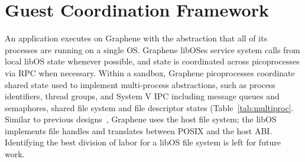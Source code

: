 \section{Guest Coordination Framework}
\label{sec:namespaces}



An application executes on Graphene 
with the abstraction that all of its processes are running on a single OS.
Graphene libOSes service system calls
from local libOS state whenever possible,
and state is coordinated across picoprocesses via RPC when necessary.
Within a sandbox, Graphene picoprocesses 
coordinate shared state used to implement multi-process
abstractions, such as process identifiers, thread groups, and 
System V IPC including message queues and semaphores, shared file system and file descriptor states (Table~\ref{tab:multiproc}.
Similar to previous designs~\citep{porter11drawbridge,baumann13bascule}, 
Graphene uses the host file system; 
the libOS implements file handles and translates between POSIX and the host ABI.
Identifying the best division of labor for a libOS file system is 
left for future work.

